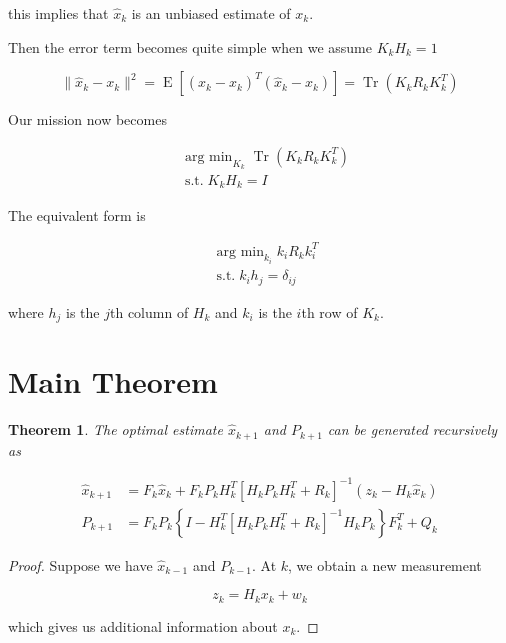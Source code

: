 \documentclass{article}
\DeclareMathOperator*{\argmin}{arg~min}
\newtheorem{theorem}{Theorem}[section]
\begin{document}
            this implies that $ \hat{x}_{k} $ is an unbiased estimate of $ x_{k} $.

            Then the error term becomes quite simple when we assume $ K_{k}H_{k} = 1 $

            \begin{equation*}
                 \| \hat{x}_{k} - x_{k} \|^{2} = \operatorname{E}\left[ (\hat{x}_{k} - x_{k})^{T} (\hat{x}_{k} - x_{k}) \right]
                 = \operatorname{Tr}\left( K_{k} R_{k} K_{k}^{T} \right)
            \end{equation*}

            Our mission now becomes

            \begin{align*}
                & \argmin_{K_{k}} \operatorname{Tr}\left( K_{k} R_{k} K_{k}^{T} \right) \\ 
                & \operatorname{s.t.} K_{k}H_{k} = I
            \end{align*}

            The equivalent form is

            \begin{align*}
                 & \argmin_{k_{i}} k_{i} R_{k} k_{i}^{T} \\
                 & \operatorname{s.t.} k_{i}h_{j} = \delta_{ij}
            \end{align*}

            where $ h_{j} $ is the $ j $th column of $ H_{k} $ and $ k_{i} $ is
            the $ i $th row of $ K_{k} $.


    \section{Main Theorem}


    \begin{theorem}
        The optimal estimate $ \hat{x}_{k+1} $ and $ P_{k+1} $ can be generated
        recursively as

        \begin{align*}
            \hat{x}_{k+1} &= F_{k} \hat{x}_{k} + F_{k} P_{k} H_{k}^{T}\left[
             H_{k} P_{k} H_{k}^{T} + R_{k} \right]^{-1}\left( z_{k} - H_{k} \hat{x}_{k} \right) \\
            P_{k+1} &= F_{k}P_{k}\left\{ I - H_{k}^{T}\left[ H_{k} P_{k}
                H_{k}^{T} + R_{k} \right]^{-1} H_{k} P_{k} \right\} F_{k}^{T} +
                Q_{k}
        \end{align*}
    \end{theorem}

    \begin{proof}
        Suppose we have $ \hat{x}_{k-1} $ and $ P_{k-1} $. At $ k $, we obtain
        a new measurement

        \begin{equation*}
             z_{k} = H_{k} x_{k} + w_{k}
        \end{equation*}

        which gives us additional information about $ x_{k} $.
    \end{proof}
\end{document}
